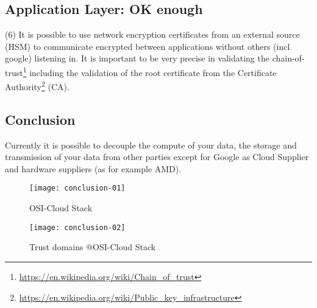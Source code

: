 \subsection{Application Layer: OK enough}
(6) It is possible to use network encryption certificates from an external source (HSM) to communicate encrypted between applications without others (incl google) listening in. It is important to be very precise in validating the chain-of-trust\footnote{\url{ https://en.wikipedia.org/wiki/Chain_of_trust}} including the validation of the root certificate from the 
Certificate Authority\footnote{\url{https://en.wikipedia.org/wiki/Public_key_infrastructure}} (CA). 

\newpage
\subsection{Conclusion}
Currently it is possible to decouple the compute of your data, the storage and transmission of your data from other parties except for Google as Cloud Supplier and hardware suppliers (as for example AMD). 

\begin{figure}[!ht]
    \centering
    \texttt{[image: conclusion-01]}
    \caption{OSI-Cloud Stack}
    \label{fig:conclusion-01}
\end{figure}

\begin{figure}[!ht]
    \centering
    \texttt{[image: conclusion-02]}
    \caption{Trust domains @OSI-Cloud Stack}
    \label{fig:conclusion-02}
\end{figure}